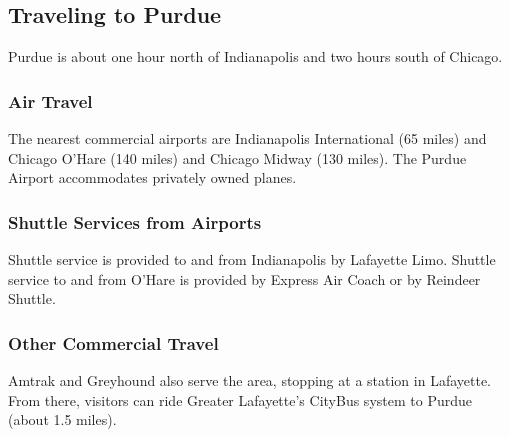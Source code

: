 \subsection{Traveling to Purdue}

Purdue is about one hour north of Indianapolis and two hours south of Chicago.

\subsubsection{Air Travel}
The nearest commercial airports are Indianapolis International (65 miles) and Chicago O’Hare (140 miles) and Chicago Midway (130 miles). The Purdue Airport accommodates privately owned planes.

\subsubsection{Shuttle Services from Airports}
Shuttle service is provided to and from Indianapolis by Lafayette Limo. Shuttle service to and from O’Hare is provided by Express Air Coach or by Reindeer Shuttle.

\subsubsection{Other Commercial Travel}
Amtrak and Greyhound also serve the area, stopping at a station in Lafayette. From there, visitors can ride Greater Lafayette's CityBus system to Purdue (about 1.5 miles).
